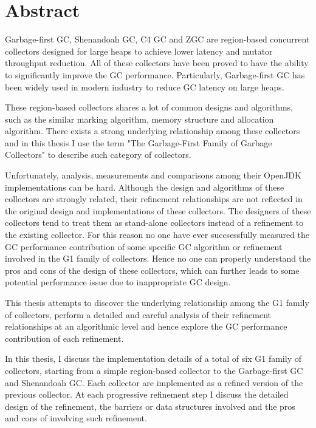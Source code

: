 \chapter*{Abstract}
\vspace{-1em}

Garbage-first GC,
Shenandoah GC, C4 GC and ZGC are region-based concurrent collectors designed for
large heaps to achieve lower latency and mutator throughput reduction.
All of these collectors have been proved to have the ability to
significantly improve the GC performance.
Particularly, Garbage-first GC has been widely used in modern industry to reduce
GC latency on large heaps.

These region-based collectors shares a lot of common designs and algorithms, such as
the similar marking algorithm, memory structure and allocation algorithm.
There exists a strong underlying relationship among these collectors and in this
thesis I use the term "The Garbage-First Family of Garbage Collectors" to describe
such category of collectors.

Unfortunately, analysis, measurements and comparisons among their OpenJDK implementations can be
hard. Although the design and algorithms of these collectors are strongly related,
their refinement relationships are not reflected in the
original design and implementations of these collectors.
The designers of these collectors tend to treat them as stand-alone collectors instead
of a refinement to the existing collector.
For this reason no one have ever succsessfully measured
the GC performance contribution of some specific GC algorithm or refinement involved
in the G1 family of collectors. Hence no one can properly understand the pros and cons
of the design of these collectors, which can further leads to some potential performance
issue due to inappropriate GC design.

This thesis attempts to discover the underlying relationship among the G1 family of collectors,
perform a detailed and careful analysis of their refinement relationships at an algorithmic level
and hence explore the GC performance contribution of each refinement.

In this thesis, I discuss the implementation details of a total of six G1 family
of collectors, starting from a simple region-based
collector to the Garbage-first GC and Shenandoah GC.
Each collector are implemented as a refined version of the previous collector.
At each progressive refinement step I discuss the detailed
design of the refinement, the barriers or data structures involved and the pros and cons
of involving such refinement.

